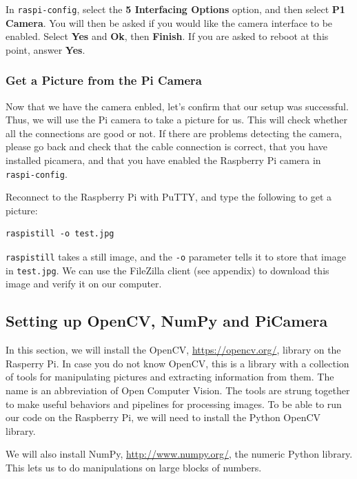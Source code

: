 In \lstinline{raspi-config}, select the \textbf{5 Interfacing Options} option, and then select \textbf{P1 Camera}. 
You will then be asked if you would like the camera interface to be enabled. Select \textbf{Yes} and \textbf{Ok}, then \textbf{Finish}. 
If you are asked to reboot at this point, answer \textbf{Yes}. 


\subsubsection{Get a Picture from the Pi Camera}
\label{get_a_picture}

Now that we have the camera enbled, let's confirm that our setup was successful.
Thus, we will use the Pi camera to take a picture for us. 
This will check whether all the connections are good or not.
If there are problems detecting the camera, please go back and check that the cable
connection is correct, that you have installed picamera, and that you have enabled the
Raspberry Pi camera in \lstinline{raspi-config}.

Reconnect to the Raspberry Pi with PuTTY, and type the following to get a picture:

\begin{lstlisting}
raspistill -o test.jpg
\end{lstlisting}

\lstinline{raspistill} takes a still image, and the \lstinline{-o} parameter tells it to store that image in
\lstinline{test.jpg}. We can use the FileZilla client (see appendix) to download this image and verify it on our computer. 


\subsection{Setting up OpenCV, NumPy and PiCamera}
\label{setup_opencv}

In this section, we will install the OpenCV, \url{https://opencv.org/}, library  on the Rasperry Pi. In case you do not know OpenCV, this 
is  a library with a collection of tools for manipulating pictures and extracting
information from them. The name is an abbreviation of Open Computer Vision. The tools are
strung together to make useful behaviors and pipelines for processing images. To be able to
run our code on the Raspberry Pi, we will need to install the Python OpenCV library.

We will also install NumPy, \url{http://www.numpy.org/}, the numeric Python library. This lets us to do manipulations on
large blocks of numbers. 

